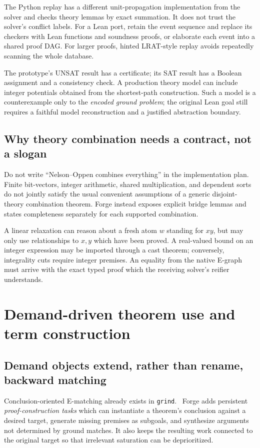 \documentclass[11pt,letterpaper]{article}
\newcommand{\grind}{\texttt{grind}}
\theoremstyle{definition}\newtheorem{definition}[proposition]{Definition}
\begin{document}
The Python replay has a different unit-propagation implementation from the solver and checks theory lemmas by exact summation. It does not trust the solver's conflict labels. For a Lean port, retain the event sequence and replace its checkers with Lean functions and soundness proofs, or elaborate each event into a shared proof DAG. For larger proofs, hinted LRAT-style replay avoids repeatedly scanning the whole database.

The prototype's UNSAT result has a certificate; its SAT result has a Boolean assignment and a consistency check. A production theory model can include integer potentials obtained from the shortest-path construction. Such a model is a counterexample only to the \emph{encoded ground problem}; the original Lean goal still requires a faithful model reconstruction and a justified abstraction boundary.

\subsection{Why theory combination needs a contract, not a slogan}
Do not write ``Nelson--Oppen combines everything'' in the implementation plan. Finite bit-vectors, integer arithmetic, shared multiplication, and dependent sorts do not jointly satisfy the usual convenient assumptions of a generic disjoint-theory combination theorem. Forge instead exposes explicit bridge lemmas and states completeness separately for each supported combination.

A linear relaxation can reason about a fresh atom $w$ standing for $xy$, but may only use relationships to $x,y$ which have been proved. A real-valued bound on an integer expression may be imported through a cast theorem; conversely, integrality cuts require integer premises. An equality from the native E-graph must arrive with the exact typed proof which the receiving solver's reifier understands.

\section{Demand-driven theorem use and term construction}
\label{sec:demand}
\subsection{Demand objects extend, rather than rename, backward matching}
Conclusion-oriented E-matching already exists in \grind{}.~\cite{grindematch} Forge adds persistent \emph{proof-construction tasks} which can instantiate a theorem's conclusion against a desired target, generate missing premises as subgoals, and synthesize arguments not determined by ground matches. It also keeps the resulting work connected to the original target so that irrelevant saturation can be deprioritized.
\end{document}

